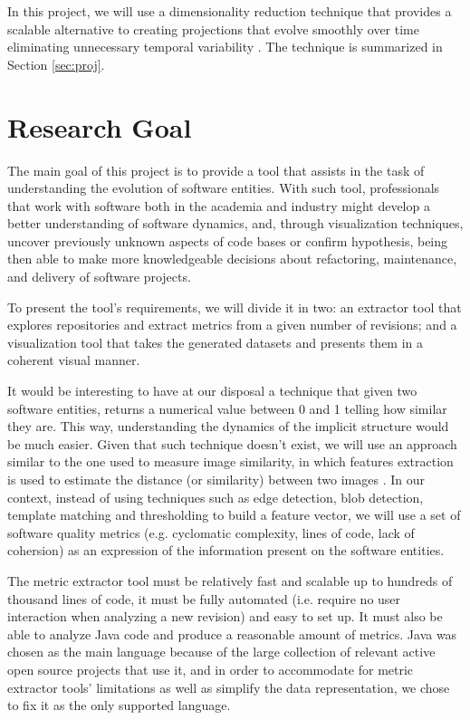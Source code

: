 In this project, we will use a dimensionality reduction technique that provides a scalable alternative to creating projections that evolve smoothly over time eliminating unnecessary temporal variability \cite{ref:dtsne}. The technique is summarized in Section \ref{sec:proj}.

\section{Research Goal} \label{research_goal}
The main goal of this project is to provide a tool that assists in the task of understanding the evolution of software entities. With such tool, professionals that work with software both in the academia and industry might develop a better understanding of software dynamics, and, through visualization techniques, uncover previously unknown aspects of code bases or confirm hypothesis, being then able to make more knowledgeable decisions about refactoring, maintenance, and delivery of software projects.

To present the tool's requirements, we will divide it in two: an extractor tool that explores repositories and extract metrics from a given number of revisions; and a visualization tool that takes the generated datasets and presents them in a coherent visual manner.

It would be interesting to have at our disposal a technique that given two software entities, returns a numerical value between 0 and 1 telling how similar they are. This way, understanding the dynamics of the implicit structure would be much easier. Given that such technique doesn't exist, we will use an approach similar to the one used to measure image similarity, in which features extraction is used to estimate the distance (or similarity) between two images  \cite{ref:imagefeatures}. In our context, instead of using techniques such as edge detection, blob detection, template matching and thresholding to build a feature vector, we will use a set of software quality metrics (e.g. cyclomatic complexity, lines of code, lack of cohersion) as an expression of the information present on the software entities.

The metric extractor tool must be relatively fast and scalable up to hundreds of thousand lines of code, it must be fully automated (i.e. require no user interaction when analyzing a new revision) and easy to set up. It must also be able to analyze Java code and produce a reasonable amount of metrics. Java was chosen as the main language because of the large collection of relevant active open source projects that use it, and in order to accommodate for metric extractor tools' limitations as well as simplify the data representation, we chose to fix it as the only supported language.

